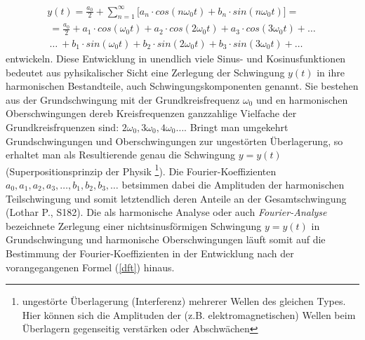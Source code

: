 \documentclass[11pt]{report}
\begin{document}
\begin{equation} \label{dft}
\begin{split}
y(t) =\frac{a_0}{2}+\sum_{n=1}^{\infty} \lbrack a_n \cdot cos(n \omega_0 t) + b_n \cdot sin(n \omega_0 t) \rbrack = \\\
= \frac{a_0}{2}+a_1 \cdot cos(\omega_0 t) + a_2 \cdot cos(2 \omega_0 t) + a_3 \cdot cos(3 \omega_0 t) + \dots \ \\\
\dots \ + b_1 \cdot sin(\omega_0 t) + b_2 \cdot sin(2 \omega_0 t) + b_3 \cdot sin(3 \omega_0 t) + \dots\ 
\end{split}
\end{equation}
entwickeln. Diese Entwicklung in unendlich viele Sinus- und Kosinusfunktionen bedeutet aus pyhsikalischer Sicht eine Zerlegung der Schwingung $y(t)$ in ihre harmonischen Bestandteile, auch Schwingungskomponenten genannt. Sie bestehen aus der Grundschwingung mit der Grundkreisfrequenz $\omega_0$ und en harmonischen Oberschwingungen dereb Kreisfrequenzen ganzzahlige Vielfache der Grundkreisfrquenzen sind: $2\omega_0, 3\omega_0, 4\omega_0 \dots $. Bringt man umgekehrt Grundschwingungen und Oberschwingungen zur ungestörten Überlagerung, so erhaltet man als Resultierende genau die Schwingung $y = y(t)$ (Superpositionsprinzip der Physik \footnote{ungestörte Überlagerung (Interferenz) mehrerer Wellen des gleichen Types. Hier können sich die Amplituden der (z.B. elektromagnetischen) Wellen beim Überlagern gegenseitig verstärken oder Abschwächen}). Die Fourier-Koeffizienten $a_0, a_1, a_2, a_3, \dots, b_1, b_2, b_3, \dots $ betsimmen dabei die Amplituden der harmonischen Teilschwingung und somit letztendlich deren Anteile an der Gesamtschwingung (Lothar P., S182). Die als harmonische Analyse oder auch \emph{Fourier-Analyse} bezeichnete Zerlegung einer nichtsinusförmigen Schwingung $y=y(t)$ in Grundschwingung und harmonische Oberschwingungen läuft somit auf die Bestimmung der Fourier-Koeffizienten in der Entwicklung nach der vorangegangenen Formel (\ref{dft}) hinaus. 
\end{document}
